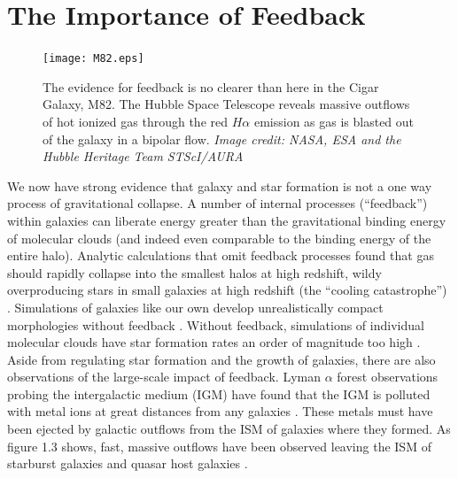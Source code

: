 \section{The Importance of Feedback}
\begin{figure}
    \texttt{[image: M82.eps]}
	\caption[Massive outflows in M82]{The evidence for feedback is no clearer
	than here in the Cigar Galaxy, M82.  The Hubble Space Telescope reveals massive
	outflows of hot ionized gas through the red $H\alpha$ emission as gas is
	blasted out of the galaxy in a bipolar flow. \textit{Image credit: NASA, ESA
	and the Hubble Heritage Team STScI/AURA}}
\end{figure}
We now have strong evidence that galaxy and star formation is not a one way process of
gravitational collapse.  A number of internal processes (``feedback'') within
galaxies can liberate energy greater than the gravitational binding energy of
molecular clouds (and indeed even comparable to the binding energy of the entire
halo).  Analytic calculations that omit feedback processes found that gas should
rapidly collapse into the smallest halos at high redshift, wildy overproducing
stars in small galaxies at high redshift (the ``cooling catastrophe'')
\citep{Cole2001,Benson2003}.  Simulations of galaxies like our own develop unrealistically
compact morphologies without feedback \citep{Stinson2006}.  Without feedback, simulations of
individual molecular clouds have star formation rates an order of magnitude
too high \citep{Agertz2013}.  Aside from regulating star formation and the
growth of galaxies, there are also observations of the large-scale impact of
feedback. Lyman $\alpha$ forest observations probing the intergalactic medium
(IGM) have found that the IGM is polluted with metal ions at great distances
from any galaxies \citep{Sargent1988,Songaila1996,Dave1998}.  These metals must have
been ejected by galactic outflows from the ISM of galaxies where they formed.
As figure 1.3 shows, fast, massive outflows have been observed leaving the ISM of
starburst galaxies and quasar host galaxies \citep{Veilleux2005,Werk2014}.


